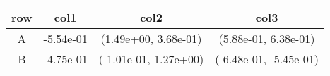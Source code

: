 \begin{tabular}{cccc}
\toprule
row&col1&col2&col3\tabularnewline
\midrule
A&-5.54e-01& (1.49e+00, 3.68e-01)& (5.88e-01, 6.38e-01)\tabularnewline
B&-4.75e-01& (-1.01e-01, 1.27e+00)& (-6.48e-01, -5.45e-01)\tabularnewline
\bottomrule
\end{tabular}
